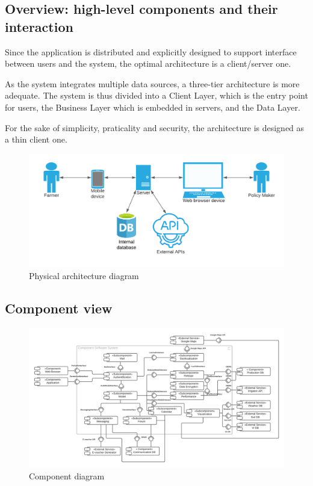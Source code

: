 \subsection{Overview: high-level components and their interaction}

Since the application is distributed and explicitly designed to support interface between users and the system, the optimal architecture is a client/server one. 

As the system integrates multiple data sources, a three-tier architecture is more adequate. The system is thus divided into a Client Layer, which is the entry point for users, the Business Layer which is embedded in servers, and the Data Layer. 

For the sake of simplicity, praticality and security, the architecture is designed as a thin client one.

\begin{figure} [!h]
	\centering
	\includegraphics[width=\textwidth]{Images/architecture-diagram.png}
	\caption{\label{fig:seq} Physical architecture diagram}
\end{figure}


\subsection{Component view}
\begin{figure} [!h]
	\centering
	\includegraphics[width=\textwidth]{Images/component-diagram.png}
	\caption{\label{fig:seq} Component diagram}
\end{figure}